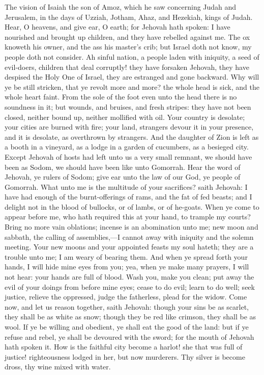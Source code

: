 


The vision of Isaiah the son of Amoz, which he saw concerning Judah and Jerusalem, in the days of Uzziah, Jotham, Ahaz, and Hezekiah, kings of Judah.  Hear, O heavens, and give ear, O earth; for Jehovah hath spoken: I have nourished and brought up children, and they have rebelled against me. The ox knoweth his owner, and the ass his master’s crib; but Israel doth not know, my people doth not consider. Ah sinful nation, a people laden with iniquity, a seed of evil-doers, children that deal corruptly! they have forsaken Jehovah, they have despised the Holy One of Israel, they are estranged and gone backward. Why will ye be still stricken, that ye revolt more and more? the whole head is sick, and the whole heart faint. From the sole of the foot even unto the head there is no soundness in it; but wounds, and bruises, and fresh stripes: they have not been closed, neither bound up, neither mollified with oil. Your country is desolate; your cities are burned with fire; your land, strangers devour it in your presence, and it is desolate, as overthrown by strangers. And the daughter of Zion is left as a booth in a vineyard, as a lodge in a garden of cucumbers, as a besieged city. Except Jehovah of hosts had left unto us a very small remnant, we should have been as Sodom, we should have been like unto Gomorrah.  Hear the word of Jehovah, ye rulers of Sodom; give ear unto the law of our God, ye people of Gomorrah. What unto me is the multitude of your sacrifices? saith Jehovah: I have had enough of the burnt-offerings of rams, and the fat of fed beasts; and I delight not in the blood of bullocks, or of lambs, or of he-goats. When ye come to appear before me, who hath required this at your hand, to trample my courts? Bring no more vain oblations; incense is an abomination unto me; new moon and sabbath, the calling of assemblies,—I cannot away with iniquity and the solemn meeting. Your new moons and your appointed feasts my soul hateth; they are a trouble unto me; I am weary of bearing them. And when ye spread forth your hands, I will hide mine eyes from you; yea, when ye make many prayers, I will not hear: your hands are full of blood. Wash you, make you clean; put away the evil of your doings from before mine eyes; cease to do evil; learn to do well; seek justice, relieve the oppressed, judge the fatherless, plead for the widow.  Come now, and let us reason together, saith Jehovah: though your sins be as scarlet, they shall be as white as snow; though they be red like crimson, they shall be as wool. If ye be willing and obedient, ye shall eat the good of the land: but if ye refuse and rebel, ye shall be devoured with the sword; for the mouth of Jehovah hath spoken it.  How is the faithful city become a harlot! she that was full of justice! righteousness lodged in her, but now murderers. Thy silver is become dross, thy wine mixed with water. 